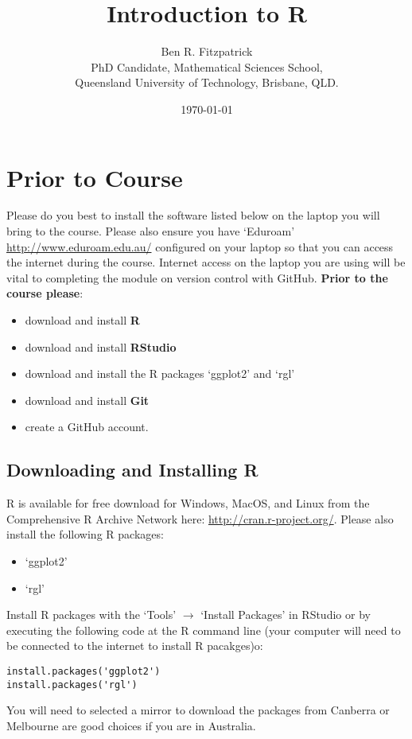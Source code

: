 \documentclass{article}[12pt]
\begin{document}
\title{Introduction to R}
\author{Ben R. Fitzpatrick\\ 
\small PhD Candidate, Mathematical Sciences School,\\
\small Queensland University of Technology, Brisbane, QLD.}
\date{\today}
\maketitle

\section*{Prior to Course}
Please do you best to install the software listed below on the laptop you will bring to the course.
Please also ensure you have `Eduroam' \url{http://www.eduroam.edu.au/} configured on your laptop so that you can access the internet during the course.  
Internet access on the laptop you are using will be vital to completing the module on version control with GitHub.
\newline
\newline
\textbf{Prior to the course please}: \begin{itemize}
\item download and install \textbf{R}
\item download and install \textbf{RStudio}
\item download and install the R packages `ggplot2' and `rgl'
\item download and install \textbf{Git}
\item create a GitHub account. \end{itemize}

\subsection*{Downloading and Installing R}
R is available for free download for Windows, MacOS, and Linux from the Comprehensive R Archive Network here: \url{http://cran.r-project.org/}.
\newline
\newline
Please also install the following R packages:  \begin{itemize}
 \item `ggplot2'
 \item `rgl' \end{itemize}
Install R packages with the `Tools' $\rightarrow$ `Install Packages' in RStudio or by executing the following code at the R command line (your computer will need to be connected to the internet to install R pacakges)o:
\begin{verbatim}
install.packages('ggplot2')
install.packages('rgl')
\end{verbatim}
You will need to selected a mirror to download the packages from Canberra or Melbourne are good choices if you are in Australia.
\end{document}
